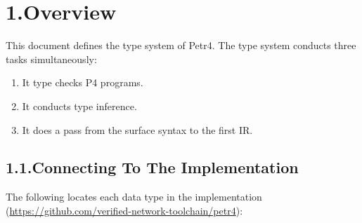 \documentclass[11pt]{article}
\begin{document}
{\begin{mdtoc}
\begin{mdtocblock}
\begin{mdtocblock}
\begin{mdtocblock}
\end{mdtocblock}%
\end{mdtocblock}%
\end{mdtocblock}%
\end{mdtoc}%

\section{1.\hspace*{0.5em}Overview}%

\noindent{}This document defines the type system of Petr4. The type system
conducts three tasks simultaneously:%

\begin{enumerate}[noitemsep,topsep=\mdcompacttopsep]%

\item{}It type checks P4 programs.%

\item{}It conducts type inference.%

\item{}It does a pass from the surface syntax to the first IR.%
\end{enumerate}%

\subsection{1.1.\hspace*{0.5em}Connecting To The Implementation}%

\noindent{}The following locates each data type in the implementation
(\href{https://github.com/verified-network-toolchain/petr4}{{\ttfamily https://\hspace{0pt}github.\hspace{0pt}com/\hspace{0pt}verified-\hspace{0pt}network-\hspace{0pt}toolchain/\hspace{0pt}petr4}}):%

}
\end{document}

